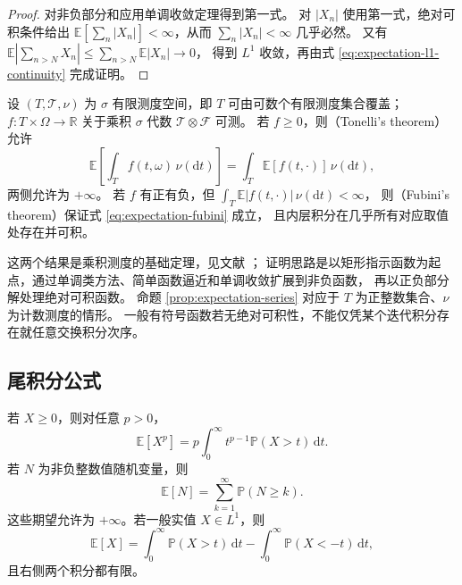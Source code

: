\documentclass[UTF8]{ctexart}
\begin{document}
\begin{proof}
对非负部分和应用单调收敛定理得到第一式。
对 $|X_n|$ 使用第一式，绝对可积条件给出
$\mathbb E[\sum_n|X_n|]<\infty$，从而 $\sum_n|X_n|<\infty$ 几乎必然。
又有
$\mathbb E|\sum_{n>N}X_n|\leq\sum_{n>N}\mathbb E|X_n|\to0$，
得到 $L^1$ 收敛，再由式 \eqref{eq:expectation-l1-continuity} 完成证明。
\end{proof}

\begin{theorem}
\label{thm:expectation-fubini}
设 $(T,\mathcal T,\nu)$ 为 $\sigma$ 有限测度空间，即 $T$ 可由可数个有限测度集合覆盖；
$f:T\times\Omega\to\mathbb R$ 关于乘积 $\sigma$ 代数 $\mathcal T\otimes\mathcal F$ 可测。
若 $f\geq0$，则（Tonelli's theorem）允许
\begin{equation}
  \mathbb E\!\left[\int_T f(t,\omega)\,\nu(\mathrm dt)\right]
  =\int_T\mathbb E[f(t,\cdot)]\,\nu(\mathrm dt),
  \label{eq:expectation-fubini}
\end{equation}
两侧允许为 $+\infty$。
若 $f$ 有正有负，但
$\int_T\mathbb E|f(t,\cdot)|\,\nu(\mathrm dt)<\infty$，
则（Fubini's theorem）保证式 \eqref{eq:expectation-fubini} 成立，
且内层积分在几乎所有对应取值处存在并可积。
\end{theorem}

这两个结果是乘积测度的基础定理，见文献 \cite[第 1.7 节]{durrett-pte}；
证明思路是以矩形指示函数为起点，通过单调类方法、简单函数逼近和单调收敛扩展到非负函数，
再以正负部分解处理绝对可积函数。
命题 \ref{prop:expectation-series} 对应于 $T$ 为正整数集合、$\nu$ 为计数测度的情形。
一般有符号函数若无绝对可积性，不能仅凭某个迭代积分存在就任意交换积分次序。

\subsection{尾积分公式}

\begin{proposition}[由尾概率计算期望与矩]
\label{prop:expectation-tail-integral}
若 $X\geq0$，则对任意 $p>0$，
\begin{equation}
  \mathbb E[X^p]
  =p\int_0^\infty t^{p-1}\mathbb P(X>t)\,\mathrm dt.
  \label{eq:expectation-tail-integral}
\end{equation}
若 $N$ 为非负整数值随机变量，则
\[
  \mathbb E[N]=\sum_{k=1}^\infty\mathbb P(N\geq k).
\]
这些期望允许为 $+\infty$。若一般实值 $X\in L^1$，则
\[
  \mathbb E[X]
  =\int_0^\infty\mathbb P(X>t)\,\mathrm dt
   -\int_0^\infty\mathbb P(X<-t)\,\mathrm dt,
\]
且右侧两个积分都有限。
\end{proposition}
\end{document}
